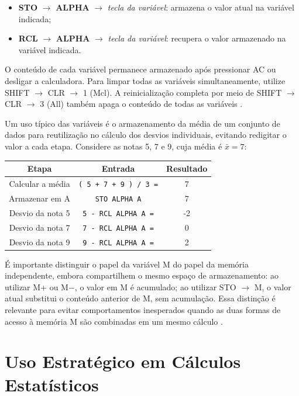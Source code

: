 \begin{itemize}
    \item \textbf{STO} $\to$ \textbf{ALPHA} $\to$ \textit{tecla da variável}: armazena o valor atual na variável indicada;
    \item \textbf{RCL} $\to$ \textbf{ALPHA} $\to$ \textit{tecla da variável}: recupera o valor armazenado na variável indicada.
\end{itemize}

O conteúdo de cada variável permanece armazenado após pressionar AC ou desligar a calculadora. Para limpar todas as variáveis simultaneamente, utilize SHIFT $\to$ CLR $\to$ 1 (Mcl). A reinicialização completa por meio de SHIFT $\to$ CLR $\to$ 3 (All) também apaga o conteúdo de todas as variáveis \cite{casio2004}.

Um uso típico das variáveis é o armazenamento da média de um conjunto de dados para reutilização no cálculo dos desvios individuais, evitando redigitar o valor a cada etapa. Considere as notas 5, 7 e 9, cuja média é $\bar{x} = 7$:

\begin{table}[H]
    \centering
        \begin{tabular}{|c|c|c|}
        \hline
        \textbf{Etapa} & \textbf{Entrada} & \textbf{Resultado} \\ \hline
            Calcular a média & \texttt{( 5 + 7 + 9 ) / 3 =} & 7 \\
            Armazenar em A & \texttt{STO ALPHA A} & 7 \\
            Desvio da nota 5 & \texttt{5 - RCL ALPHA A =} & -2 \\
            Desvio da nota 7 & \texttt{7 - RCL ALPHA A =} & 0 \\
            Desvio da nota 9 & \texttt{9 - RCL ALPHA A =} & 2 \\ \hline
        \end{tabular}
\end{table}

É importante distinguir o papel da variável M do papel da memória independente, embora compartilhem o mesmo espaço de armazenamento: ao utilizar M+ ou M$-$, o valor em M é acumulado; ao utilizar STO $\to$ M, o valor atual substitui o conteúdo anterior de M, sem acumulação. Essa distinção é relevante para evitar comportamentos inesperados quando as duas formas de acesso à memória M são combinadas em um mesmo cálculo \cite{casio2004}.

\section{Uso Estratégico em Cálculos Estatísticos}

